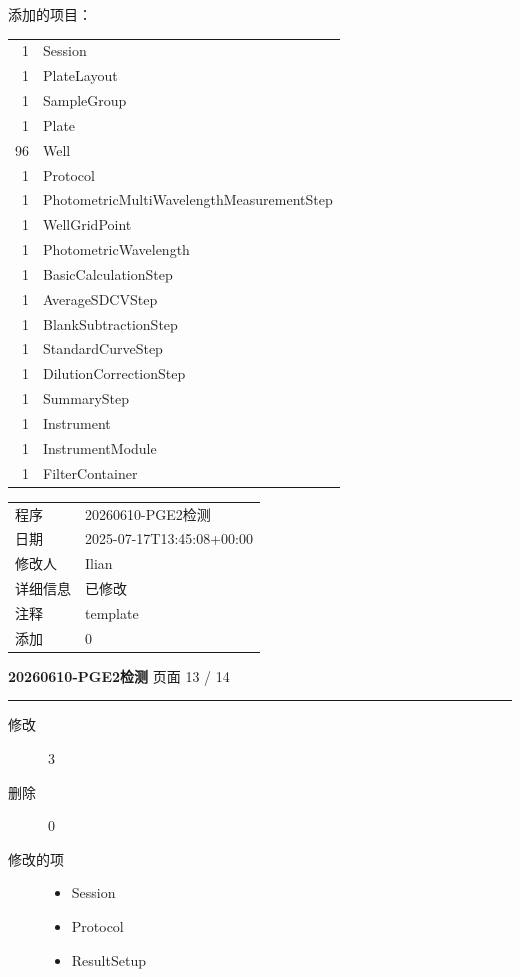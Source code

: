 \documentclass[UTF8,10pt,a4paper,fontset=fandol]{ctexart}
\begin{document}
\vspace{0.5em}

\noindent 添加的项目：

\begin{tabular}{@{}rl@{}}
1 & Session\\
1 & PlateLayout\\
1 & SampleGroup\\
1 & Plate\\
96 & Well\\
1 & Protocol\\
1 & PhotometricMultiWavelengthMeasurementStep\\
1 & WellGridPoint\\
1 & PhotometricWavelength\\
1 & BasicCalculationStep\\
1 & AverageSDCVStep\\
1 & BlankSubtractionStep\\
1 & StandardCurveStep\\
1 & DilutionCorrectionStep\\
1 & SummaryStep\\
1 & Instrument\\
1 & InstrumentModule\\
1 & FilterContainer\\
\end{tabular}

\vspace{1em}

\begin{tabular}{@{}ll@{}}
程序 & 20260610-PGE2检测\\
日期 & 2025-07-17T13:45:08+00:00\\
修改人 & Ilian\\
详细信息 & 已修改\\
注释 & template\\
添加 & 0\\
\end{tabular}

\newpage

\begin{flushleft}
\small
\textbf{20260610-PGE2检测} \hfill 页面 13 / 14
\end{flushleft}

\hrule

\begin{description}
  \item[修改] 3
  \item[删除] 0
  \item[修改的项]
    \begin{itemize}
      \item[1] Session
      \item[1] Protocol
      \item[1] ResultSetup
    \end{itemize}
\end{description}
\end{document}
